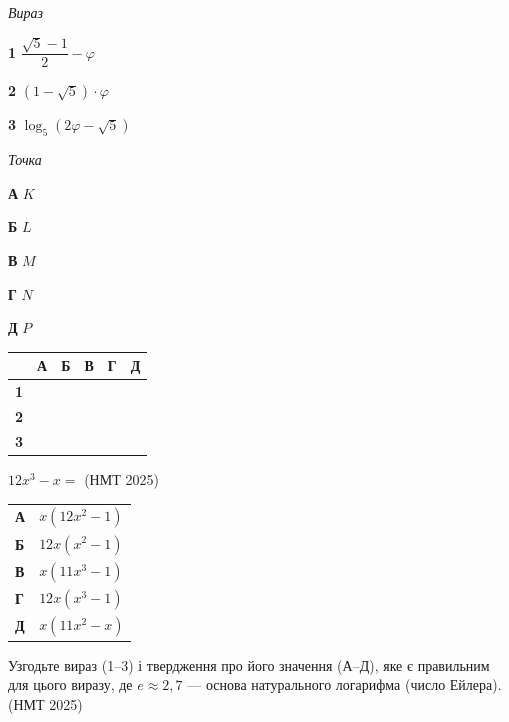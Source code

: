 \documentclass[14pt]{extarticle}
\newcommand{\matchTable}{
\begin{tabular}{|>{\centering\arraybackslash}p{0.25cm}|*{5}{>{\centering\arraybackslash}p{0.25cm}|}}
\hline
& \scriptsize\textbf{А} & \scriptsize\textbf{Б} & \scriptsize\textbf{В} & \scriptsize\textbf{Г} & \scriptsize\textbf{Д} \\
\hline
\scriptsize\textbf{1} & \rule{0pt}{0.25cm} & & & & \\
\hline
\scriptsize\textbf{2} & \rule{0pt}{0.25cm} & & & & \\
\hline
\scriptsize\textbf{3} & \rule{0pt}{0.25cm} & & & & \\
\hline
\end{tabular}
}
\newcommand{\task}[2]{\noindent\makebox[1.5em][l]{\textbf{#1.}}\parbox[t]{\dimexpr\textwidth-1.5em}{#2}}
\newcommand{\nmtyear}[1]{\hfill{\small\color{yearcolor}(НМТ #1)}}
\begin{document}
\vspace{0.3cm}
\noindent
\begin{minipage}[t]{0.3\textwidth}
\vspace{0pt}
\textit{Вираз}

\vspace{0.2cm}
\textbf{1} \quad $\dfrac{\sqrt{5} - 1}{2} - \varphi$

\vspace{0.3cm}
\textbf{2} \quad $(1 - \sqrt{5}) \cdot \varphi$

\vspace{0.2cm}
\textbf{3} \quad $\log_5(2\varphi - \sqrt{5})$
\end{minipage}
\hfill
\begin{minipage}[t]{0.35\textwidth}
\vspace{0pt}
\textit{Точка}

\vspace{0.2cm}
\textbf{А} \quad $K$

\vspace{0.2cm}
\textbf{Б} \quad $L$

\vspace{0.2cm}
\textbf{В} \quad $M$

\vspace{0.2cm}
\textbf{Г} \quad $N$

\vspace{0.2cm}
\textbf{Д} \quad $P$
\end{minipage}
\hfill
\begin{minipage}[t]{0.18\textwidth}
\vspace{0pt}
\matchTable
\end{minipage}

\vspace{0.7cm}

\task{26}{$12x^3 - x =$ \nmtyear{2025}}

\vspace{0.2cm}
\begin{tabular}{ll}
\textbf{А} & $x(12x^2 - 1)$ \\
\textbf{Б} & $12x(x^2 - 1)$ \\
\textbf{В} & $x(11x^3 - 1)$ \\
\textbf{Г} & $12x(x^3 - 1)$ \\
\textbf{Д} & $x(11x^2 - x)$ \\
\end{tabular}

\vspace{0.7cm}

\task{27}{Узгодьте вираз (1--3) і твердження про його значення (А--Д), яке є правильним для цього виразу, де $e \approx 2{,}7$ --- основа натурального логарифма (число Ейлера). \nmtyear{2025}}
\end{document}

